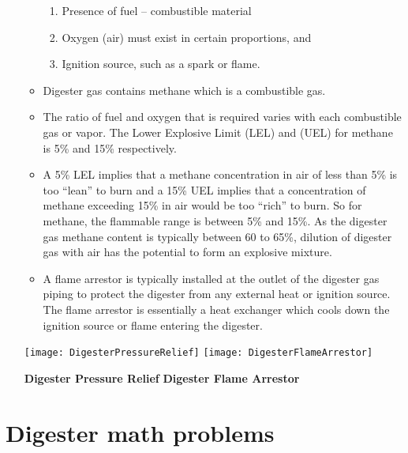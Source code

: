 \begin{enumerate}[A.]
\begin{itemize}
\begin{enumerate}
                    \item Presence of fuel – combustible material
                    \item Oxygen (air) must exist in certain proportions, and
                    \item Ignition source, such as a spark or flame.
                \end{enumerate}  
            \item Digester gas contains methane which is a combustible gas.  
            \item The ratio of fuel and oxygen that is required varies with each combustible gas or vapor. The Lower Explosive Limit (LEL) and (UEL) for methane is 5\% and 15\% respectively.  
            \item A 5\% LEL implies that a methane concentration in air of less than 5\% is too “lean” to burn and a 15\% UEL implies that a concentration of methane exceeding 15\% in air would be too “rich” to burn.  So for methane, the flammable range is between 5\% and 15\%.  As the digester gas methane content is typically between 60 to 65\%, dilution of digester gas with air has the potential to form an explosive mixture. 
            \item A flame arrestor is typically installed at the outlet of the digester gas piping to protect the digester from any external heat or ignition source.  The flame arrestor is essentially a heat exchanger which cools down the ignition source or flame entering the digester. 
        \end{itemize}
        \begin{center}
            \texttt{[image: DigesterPressureRelief]} \hspace{5cm} \texttt{[image: DigesterFlameArrestor]} \\
        \end{center}
        \hspace{2cm}\textbf{Digester Pressure Relief} \hspace{3cm} \textbf{Digester Flame Arrestor}\\
\end{enumerate}








\section{Digester math problems}

